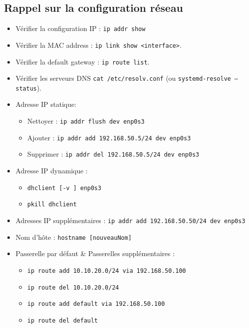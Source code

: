 \documentclass[a4paper]{article}
\begin{document}
\subsection{Rappel sur la configuration réseau}





\begin{itemize}

\item Vérifier la configuration IP : \texttt{ip addr show}

\item Vérifier la MAC address : \texttt{ip link show <interface>}.

\item Vérifier la default gateway : \texttt{ip route list}.

\item Vérifier les serveurs DNS \texttt{cat /etc/resolv.conf} (ou \texttt{systemd-resolve –status}).

\item Adresse IP statique:
\begin{itemize}
    \item Nettoyer : \texttt{ip addr flush dev enp0s3}
    \item Ajouter : \texttt{ip addr add 192.168.50.5/24 dev enp0s3}
    \item Supprimer : \texttt{ip addr del 192.168.50.5/24 dev enp0s3}
\end{itemize}

\item Adresse IP dynamique :
\begin{itemize}
    \item \texttt{dhclient [-v ] enp0s3}
    \item \texttt{pkill dhclient}
\end{itemize}

\item Adresses IP supplémentaires : \texttt{ip addr add 192.168.50.50/24 dev enp0s3}

\item Nom d’hôte : \texttt{hostname [nouveauNom]}

\item Passerelle par défaut \& Passerelles supplémentaires :
\begin{itemize}
    \item \texttt{ip route add 10.10.20.0/24 via 192.168.50.100}
    \item \texttt{ip route del 10.10.20.0/24}
    \item \texttt{ip route add default via 192.168.50.100}
    \item \texttt{ip route del default}
\end{itemize}


\end{itemize}
\end{document}
